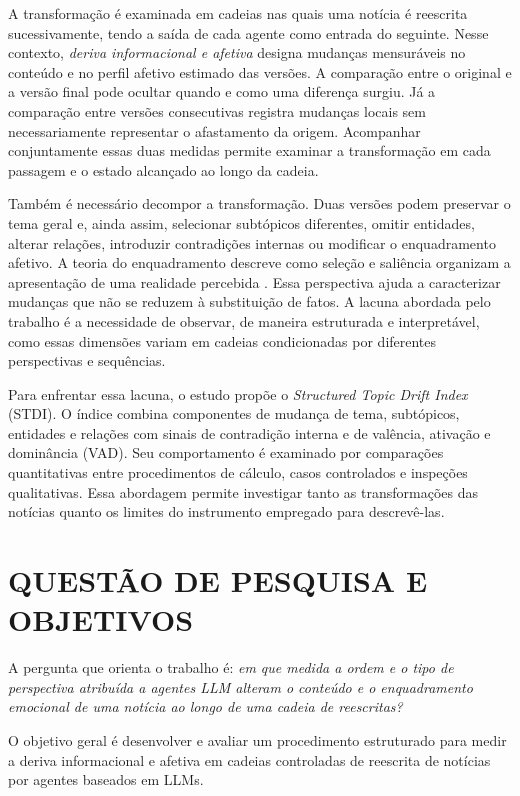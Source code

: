 A transformação é examinada em cadeias nas quais uma notícia é reescrita sucessivamente, tendo a saída de cada agente como entrada do seguinte. Nesse contexto, \emph{deriva informacional e afetiva} designa mudanças mensuráveis no conteúdo e no perfil afetivo estimado das versões. A comparação entre o original e a versão final pode ocultar quando e como uma diferença surgiu. Já a comparação entre versões consecutivas registra mudanças locais sem necessariamente representar o afastamento da origem. Acompanhar conjuntamente essas duas medidas permite examinar a transformação em cada passagem e o estado alcançado ao longo da cadeia.

Também é necessário decompor a transformação. Duas versões podem preservar o tema geral e, ainda assim, selecionar subtópicos diferentes, omitir entidades, alterar relações, introduzir contradições internas ou modificar o enquadramento afetivo. A teoria do enquadramento descreve como seleção e saliência organizam a apresentação de uma realidade percebida \cite{entman1993framing}. Essa perspectiva ajuda a caracterizar mudanças que não se reduzem à substituição de fatos. A lacuna abordada pelo trabalho é a necessidade de observar, de maneira estruturada e interpretável, como essas dimensões variam em cadeias condicionadas por diferentes perspectivas e sequências.

Para enfrentar essa lacuna, o estudo propõe o \textit{Structured Topic Drift Index} (STDI). O índice combina componentes de mudança de tema, subtópicos, entidades e relações com sinais de contradição interna e de valência, ativação e dominância (VAD). Seu comportamento é examinado por comparações quantitativas entre procedimentos de cálculo, casos controlados e inspeções qualitativas. Essa abordagem permite investigar tanto as transformações das notícias quanto os limites do instrumento empregado para descrevê-las.

\section{QUESTÃO DE PESQUISA E OBJETIVOS}
\label{sec:questao-objetivos}

A pergunta que orienta o trabalho é: \emph{em que medida a ordem e o tipo de perspectiva atribuída a agentes LLM alteram o conteúdo e o enquadramento emocional de uma notícia ao longo de uma cadeia de reescritas?}

O objetivo geral é desenvolver e avaliar um procedimento estruturado para medir a deriva informacional e afetiva em cadeias controladas de reescrita de notícias por agentes baseados em LLMs.

